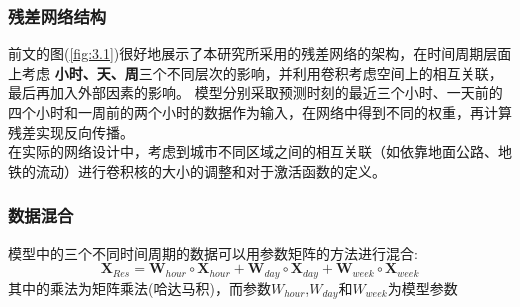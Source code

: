 \subsubsection*{残差网络结构}
前文的图(\ref{fig:3.1})很好地展示了本研究所采用的残差网络的架构，在时间周期层面上考虑 \textbf{小时、天、周}三个不同层次的影响，并利用卷积考虑空间上的相互关联，最后再加入外部因素的影响。 模型分别采取预测时刻的最近三个小时、一天前的四个小时和一周前的两个小时的数据作为输入，在网络中得到不同的权重，再计算残差实现反向传播。\\
\indent 在实际的网络设计中，考虑到城市不同区域之间的相互关联（如依靠地面公路、地铁的流动）进行卷积核的大小的调整和对于激活函数的定义。
\subsubsection*{数据混合}
模型中的三个不同时间周期的数据可以用参数矩阵的方法进行混合:
\begin{equation}
\mathbf { X } _ { R e s } = \mathbf { W } _ { hour } \circ \mathbf { X } _ { hour }  + \mathbf { W } _ {day } \circ \mathbf { X } _ { day }  + \mathbf { W } _ { week } \circ \mathbf { X } _ { week } 
\end{equation}
其中的乘法为矩阵乘法(哈达马积)，而参数$W_{hour}$,$W_{day}$和$W_{week}$为模型参数
